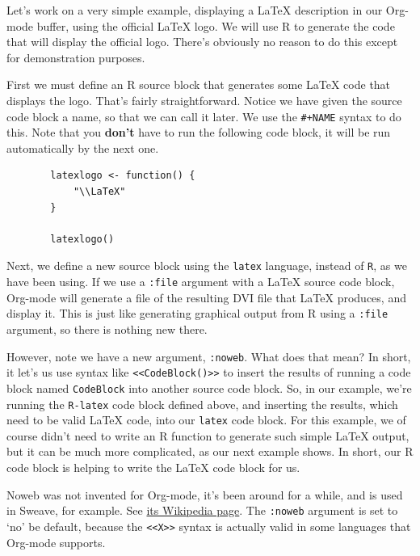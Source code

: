 \documentclass[11pt]{article}
\begin{document}
Let's work on a very simple example, displaying a \LaTeX{} description in
our Org-mode buffer, using the official \LaTeX{} logo. We will use R to
generate the code that will display the official logo. There's
obviously no reason to do this except for demonstration purposes.

First we must define an R source block that generates some \LaTeX{} code
that displays the logo. That's fairly straightforward. Notice we have
given the source code block a name, so that we can call it later. We
use the \texttt{\#+NAME} syntax to do this. Note that you \textbf{don't} have to run
the following code block, it will be run automatically by the next
one.

\begin{figure}[H]
\label{R-latex}
\begin{verbatim}
  latexlogo <- function() {
      "\\LaTeX"
  }
  
  latexlogo()
\end{verbatim}
\end{figure}

Next, we define a new source block using the \texttt{latex} language, instead
of \texttt{R}, as we have been using. If we use a \texttt{:file} argument with a
\LaTeX{} source code block, Org-mode will generate a file of the
resulting DVI file that \LaTeX{} produces, and display it. This is just
like generating graphical output from R using a \texttt{:file} argument, so
there is nothing new there.

However, note we have a new argument, \texttt{:noweb}. What does that mean?
In short, it let's us use syntax like \texttt{<<CodeBlock()>>} to insert the
results of running a code block named \texttt{CodeBlock} into another source
code block. So, in our example, we're running the \texttt{R-latex} code block
defined above, and inserting the results, which need to be valid \LaTeX{}
code, into our \texttt{latex} code block. For this example, we of course
didn't need to write an R function to generate such simple \LaTeX{}
output, but it can be much more complicated, as our next example
shows. In short, our R code block is helping to write the \LaTeX{} code
block for us.

Noweb was not invented for Org-mode, it's been around for a while, and
is used in Sweave, for example. See \href{http://en.wikipedia.org/wiki/Noweb}{its Wikipedia page}. The \texttt{:noweb}
argument is set to `no' be default, because the \texttt{<<X>>} syntax is
actually valid in some languages that Org-mode supports.
\end{document}
